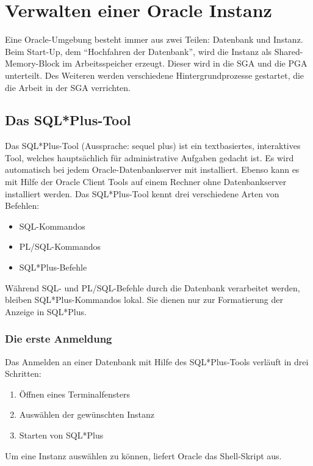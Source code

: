 \chapter{Verwalten einer Oracle Instanz}
  \chaptertoc{}
  \cleardoubleevenpage
  
      Eine Oracle-Umgebung besteht immer aus zwei Teilen: Datenbank und Instanz.
    Beim Start-Up, dem \enquote{Hochfahren der Datenbank}, wird die Instanz als
    Shared-Memory-Block im Arbeitsspeicher erzeugt. Dieser wird in die SGA und
    die PGA unterteilt. Des Weiteren werden verschiedene Hintergrundprozesse
    gestartet, die die Arbeit in der SGA verrichten.
    \section{Das SQL*Plus-Tool}
      Das SQL*Plus-Tool (Aussprache: sequel plus) ist ein textbasiertes, interaktives Tool, welches hauptsächlich für administrative Aufgaben gedacht ist. Es wird automatisch bei jedem Oracle-Datenbankserver mit installiert. Ebenso kann es mit Hilfe der Oracle Client Tools auf einem Rechner ohne Datenbankserver installiert werden.
      Das SQL*Plus-Tool kennt drei verschiedene Arten von Befehlen:
      \begin{itemize}
        \item SQL-Kommandos
        \item PL/SQL-Kommandos
        \item SQL*Plus-Befehle
      \end{itemize}
      Während SQL- und PL/SQL-Befehle durch die Datenbank verarbeitet werden,
      bleiben SQL*Plus-Kommandos lokal. Sie dienen nur zur Formatierung der
      Anzeige in SQL*Plus.
      \subsection{Die erste Anmeldung}
        Das Anmelden an einer Datenbank mit Hilfe des SQL*Plus-Tools verläuft
        in drei Schritten:
        \begin{enumerate}
          \item Öffnen eines Terminalfensters
          \item Auswählen der gewünschten Instanz
          \item Starten von SQL*Plus
        \end{enumerate}
        Um eine Instanz auswählen zu können, liefert Oracle das Shell-Skript
         aus.

